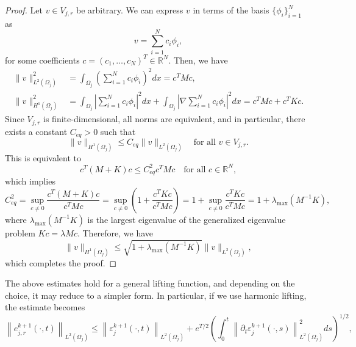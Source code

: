 \documentclass[a4paper, 11pt]{article}
\theoremstyle{remark}
\begin{document}
\begin{proof}
    Let $v \in V_{j, r}$ be arbitrary. We can express $v$ in terms of the basis $\{\phi_i\}_{i=1}^N$ as
    \begin{equation*}        
        v = \sum_{i=1}^N c_i \phi_i,
    \end{equation*}
for some coefficients $c = (c_1, \ldots, c_N)^T \in \mathbb{R}^N$. Then, we have
\begin{align*}
    \|v\|_{L^2(\Omega_j)}^2 &= \int_{\Omega_j} \left(\sum_{i=1}^N c_i \phi_i\right)^2 dx = c^T M c,\\
    \|v\|_{H^1(\Omega_j)}^2 &= \int_{\Omega_j} \left|\sum_{i=1}^N c_i \phi_i\right|^2 dx + \int_{\Omega_j} \left|\nabla \sum_{i=1}^N c_i \phi_i\right|^2 dx = c^T M c + c^T K c.
\end{align*}
Since $V_{j, r}$ is finite-dimensional, all norms are equivalent, and in particular, there exists a constant $C_{eq}>0$ such that
\begin{equation*}
    \|v\|_{H^1(\Omega_j)} \leq C_{eq} \|v\|_{L^2(\Omega_j)} \quad \text{for all } v \in V_{j, r}.
\end{equation*}
This is equivalent to
\begin{equation*}
    c^T(M + K)c \leq C_{eq}^2 c^T M c \quad \text{for all } c \in \mathbb{R}^N,
\end{equation*}
which implies 
\begin{equation*}
    C_{eq}^{2} = \sup_{c \neq 0} \dfrac{c^T(M + K)c}{c^T M c} = \sup_{c \neq 0} \left(1 + \dfrac{c^T K c}{c^T M c}\right) = 1 + \sup_{c \neq 0} \dfrac{c^T K c}{c^T M c} = 1 + \lambda_{\max}(M^{-1}K),
\end{equation*}
where $\lambda_{\max}(M^{-1}K)$ is the largest eigenvalue of the generalized eigenvalue problem $K c = \lambda M c$. Therefore, we have
\begin{equation*}
    \|v\|_{H^1(\Omega_j)} \leq \sqrt{1 + \lambda_{\max}(M^{-1}K)} \|v\|_{L^2(\Omega_j)},
\end{equation*}
which completes the proof.
\end{proof}
The above estimates hold for a general lifting function, and depending on the choice, it may reduce to a simpler form. In particular, 
if we use harmonic lifting, the estimate becomes
\begin{equation*}
    \left\lVert e_{j, r}^{k+1}(\cdot, t)\right\rVert_{L^{2}(\Omega_{j})} \leq \left\lVert\varepsilon_{j}^{k+1}(\cdot, t)\right\rVert_{L^{2}(\Omega_{j})} + e^{T/2}\left(\int_{0}^{t}\left\lVert \partial_{t}\varepsilon_{j}^{k+1}(\cdot, s)\right\rVert^{2}_{L^{2}(\Omega_{j})}ds\right)^{1/2},
\end{equation*}
\end{document}

